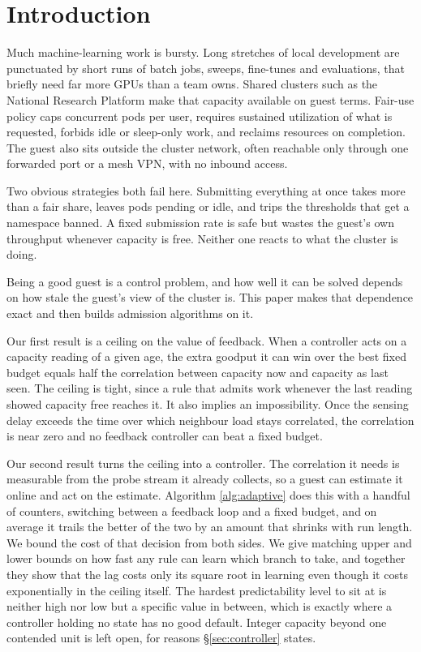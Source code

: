 \documentclass[10pt,conference,letterpaper]{IEEEtran}
\theoremstyle{remark}\newtheorem{remark}{Remark}
\begin{document}
\section{Introduction}
\label{sec:intro}
Much machine-learning work is bursty. Long stretches of local development are
punctuated by short runs of batch jobs, sweeps, fine-tunes and evaluations, that
briefly need far more GPUs than a team owns. Shared clusters such as the National
Research Platform \cite{nautilus} make that capacity available on guest terms.
Fair-use policy caps concurrent pods per user, requires sustained utilization of
what is requested, forbids idle or sleep-only work, and reclaims resources on
completion. The guest also sits outside the cluster network, often reachable only
through one forwarded port or a mesh VPN, with no inbound access.

Two obvious strategies both fail here. Submitting everything at once takes more
than a fair share, leaves pods pending or idle, and trips the thresholds that get
a namespace banned. A fixed submission rate is safe but wastes the guest's own
throughput whenever capacity is free. Neither one reacts to what the cluster is
doing.

Being a good guest is a control problem, and how well it can be solved depends on
how stale the guest's view of the cluster is. This paper makes that dependence
exact and then builds admission algorithms on it.

Our first result is a ceiling on the value of feedback. When a controller acts on
a capacity reading of a given age, the extra goodput it can win over the best
fixed budget equals half the correlation between capacity now and capacity as
last seen. The ceiling is tight, since a rule that admits work whenever the last
reading showed capacity free reaches it. It also implies an impossibility. Once
the sensing delay exceeds the time over which neighbour load stays correlated,
the correlation is near zero and no feedback controller can beat a fixed budget.

Our second result turns the ceiling into a controller. The correlation it needs is
measurable from the probe stream it already collects, so a guest can estimate it
online and act on the estimate. Algorithm \ref{alg:adaptive} does this with a
handful of counters, switching between a feedback loop and a fixed budget, and on
average it trails the better of the two by an amount that shrinks with run
length. We bound the cost of that decision from both sides. We give matching upper and lower bounds on how fast
any rule can learn which branch to take, and together they show that the lag
costs only its square root in learning even though it costs exponentially in the
ceiling itself. The hardest predictability level to sit at is
neither high nor low but a specific value in between, which is exactly where a
controller holding no state has no good default. Integer capacity beyond one
contended unit is left open, for reasons \S\ref{sec:controller} states.
\end{document}
